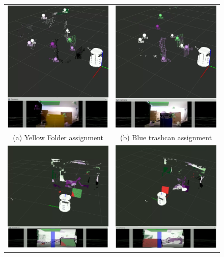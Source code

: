\documentclass [twoside,hidelinks]{article}
\begin{document}
\begin{figure}

\begin{tabular}{cc}
  \includegraphics [width=.45\textwidth]{colorBound5} &   \includegraphics [width=.45\textwidth]{colorBound6} \\
 (a) Yellow Folder assignment  &  (b) Blue trashcan assignment \\ [6pt]
	\includegraphics [width=.45\textwidth]{posBound5} &   \includegraphics [width=.45\textwidth]{posBound6} \\

\end{tabular}
\end{figure}
\end{document}
